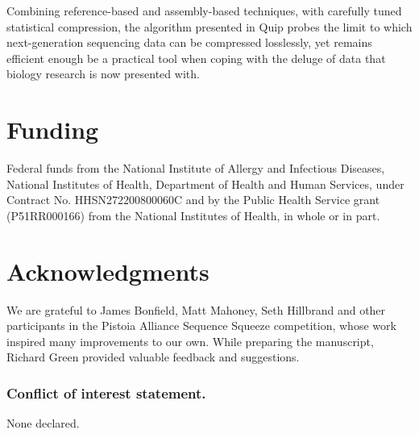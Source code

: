 \documentclass[a4,center,fleqn]{NAR}
\begin{document}
Combining reference-based and assembly-based techniques, with carefully tuned
statistical compression, the algorithm presented in Quip probes the limit to
which next-generation sequencing data can be compressed losslessly, yet
remains efficient enough be a practical tool when coping with the deluge of
data that biology research is now presented with.


\section{Funding}

Federal funds from the National Institute of Allergy and Infectious Diseases,
National Institutes of Health, Department of Health and Human Services, under
Contract No. HHSN272200800060C and by the Public Health Service grant
(P51RR000166) from the National Institutes of Health, in whole or in part.


\section{Acknowledgments}

We are grateful to James Bonfield, Matt Mahoney, Seth Hillbrand and other
participants in the Pistoia Alliance Sequence Squeeze competition, whose work
inspired many improvements to our own. While preparing the manuscript, Richard
Green provided valuable feedback and suggestions.


\subsubsection{Conflict of interest statement.} None declared.
\newpage



\end{document}
